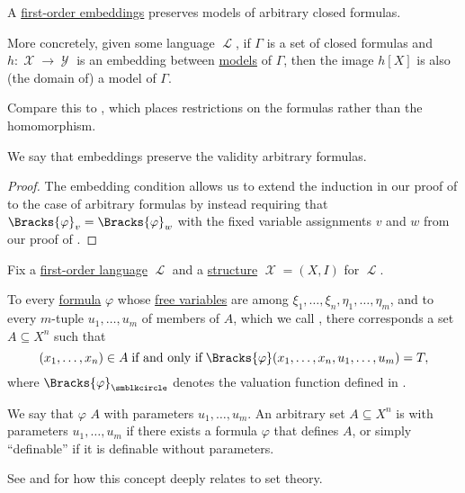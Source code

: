 \begin{proposition}\label{thm:arbitrary_formulas_preserved_under_isomorphisms}
  A \hyperref[def:first_order_embedding]{first-order embeddings} preserves models of arbitrary closed formulas.

  More concretely, given some language \( \mscrL \), if \( \Gamma \) is a set of closed formulas and \( h: \mscrX \to \mscrY \) is an embedding between \hyperref[def:first_order_model]{models} of \( \Gamma \), then the image \( h[X] \) is also (the domain of) a model of \( \Gamma \).
\end{proposition}
\begin{comments}
  \item Compare this to , which places restrictions on the formulas rather than the homomorphism.
  \item We say that embeddings preserve the validity arbitrary formulas.
\end{comments}
\begin{proof}
  The embedding condition allows us to extend the induction in our proof of  to the case of arbitrary formulas by instead requiring that \( \Bracks{\varphi}_v = \Bracks{\varphi}_w \) with the fixed variable assignments \( v \) and \( w \) from our proof of .
\end{proof}

\begin{definition}\label{def:first_order_definability}
  Fix a \hyperref[def:first_order_syntax]{first-order language} \( \mscrL \) and a \hyperref[def:first_order_structure]{structure} \( \mscrX = (X, I) \) for \( \mscrL \).

  To every \hyperref[def:first_order_syntax/formula]{formula} \( \varphi \) whose \hyperref[def:first_order_syntax/free_variable]{free variables} are among \( \xi_1, \ldots, \xi_n, \eta_1, \ldots, \eta_m \), and to every \( m \)-tuple \( u_1, \ldots, u_m \) of members of \( A \), which we call , there corresponds a set \( A \subseteq X^n \) such that
  \begin{equation*}
    (x_1, \ldots, x_n) \in A \T{if and only if} \Bracks{\varphi}(x_1, \ldots, x_n, u_1, \ldots, u_m) = T,
  \end{equation*}
  where \( \Bracks{\varphi}_{\anon} \) denotes the valuation function defined in .

  We say that \( \varphi \)  \( A \) with parameters \( u_1, \ldots, u_m \). An arbitrary set \( A \subseteq X^n \) is  with parameters \( u_1, \ldots, u_m \) if there exists a formula \( \varphi \) that defines \( A \), or simply \enquote{definable} if it is definable without parameters.
\end{definition}
\begin{comments}
  \item See  and  for how this concept deeply relates to set theory.
\end{comments}

